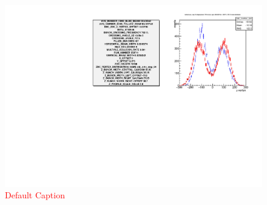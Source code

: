 \begin{figure}
\begin{center}
\includegraphics[width=\linewidth,height=\textheight,keepaspectratio]{../HourglassCorrection/figs/359711_step24_config_compare}
\caption{ \textcolor{red}{Default Caption} }
\label{fig:359711_step24_config_compare}
\end{center}
\end{figure}